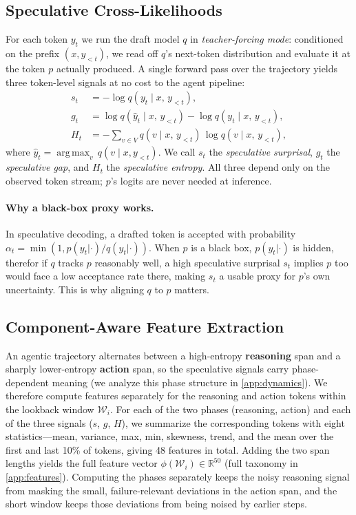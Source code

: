 \documentclass[11pt]{article}
\DeclareMathOperator*{\argmax}{arg\,max}
\begin{document}
\subsection{Speculative Cross-Likelihoods}
\label{sec:cross_likelihood}

For each token $y_t$ we run the draft model $q$ in \emph{teacher-forcing mode}: conditioned on the
prefix $(x, y_{<t})$, we read off $q$'s next-token distribution and evaluate it at the token $p$
actually produced. A single forward pass over the trajectory yields three token-level signals at no
cost to the agent pipeline:
\begin{align*}
  s_t &= -\log q(y_t \mid x,\, y_{<t}), \\
  g_t &= \log q(\hat{y}_t \mid x,\, y_{<t}) - \log q(y_t \mid x,\, y_{<t}), \\
  H_t &= -\!\sum_{v \in V} q(v \mid x,\, y_{<t})\,\log q(v \mid x,\, y_{<t}),
\end{align*}
where $\hat{y}_t = \argmax_v\, q(v \mid x, y_{<t})$. We call $s_t$ the \emph{speculative
surprisal}, $g_t$ the \emph{speculative gap}, and $H_t$ the \emph{speculative entropy}. All three
depend only on the observed token stream; $p$'s logits are never needed at inference.

\paragraph{Why a black-box proxy works.}
In speculative decoding, a drafted token is accepted with probability
$\alpha_t = \min(1, p(y_t|{\cdot})/q(y_t|{\cdot}))$. When $p$ is a black box, $p(y_t|{\cdot})$ is
hidden, therefor if $q$ tracks $p$ reasonably well, a high speculative surprisal $s_t$ implies $p$ too
would face a low acceptance rate there, making $s_t$ a usable proxy for $p$'s own uncertainty. This is why aligning $q$ to $p$ matters.

\subsection{Component-Aware Feature Extraction}
\label{sec:features}

An agentic trajectory alternates between a high-entropy \textbf{reasoning} span
and a sharply lower-entropy \textbf{action} span, so the speculative signals
carry phase-dependent meaning (we analyze this phase structure in
\autoref{app:dynamics}). We therefore
compute features separately for the reasoning and action tokens within the
lookback window $\mathcal{W}_i$.
For each of the
two phases (reasoning, action) and each of the three signals ($s$, $g$, $H$),
we summarize the corresponding tokens with eight statistics---mean, variance,
max, min, skewness, trend, and the mean over the first and last 10\% of
tokens, giving 48 features in total. Adding the two span lengths
yields the full feature vector $\phi(\mathcal{W}_i)\in\mathbb{R}^{50}$ (full
taxonomy in \autoref{app:features}). Computing the phases separately keeps the
noisy reasoning signal from masking the small, failure-relevant deviations in
the action span, and the short window keeps those deviations from being noised by earlier steps.
\end{document}
